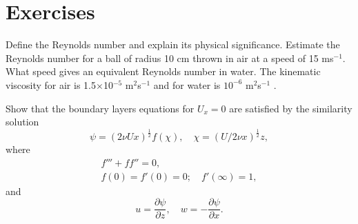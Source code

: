 \documentclass[10pt]{report}
\begin{document}
\divider
\pagebreak

\section{Exercises}

\begin{questionstar} %
	Define the Reynolds number and explain its physical significance.
	Estimate the Reynolds number for a ball of radius 10 cm thrown in air at a speed of
	15 ms$^{-1}$. What speed gives an equivalent Reynolds number in water.
	The kinematic viscosity for air is 1.5$\times $10$^{-5}$ m$^{2}$s$^{-1}$
	and for water is $10^{-6}$ m$^{2}$s$^{-1}$ .
\label{qn:reynolds-number}
\end{questionstar}


\begin{question} %
	Show that the boundary layers equations for $U_x=0$ are satisfied by the similarity solution
		\[ \psi =\left( {2\nu Ux} \right)^{\frac{1}{2}}f\left( \chi \right),
		 \quad \chi =\left( {U/ {2\nu x}} \right)^{\frac{1}{2}} z, \]
	where
		\begin{gather*} {f}'''+f{f}''=0, \\
		f(0) = f'(0) = 0; \quad f'(\infty ) = 1 ,\end{gather*}
	and
		\[ u = \frac{\partial \psi}{\partial z}, \quad w = -\frac{\partial \psi}{\partial x}. \]
\label{qn:blasius-solution}
\end{question}
\end{document}
